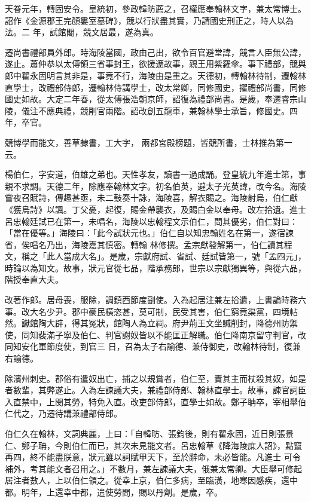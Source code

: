 \begin{pinyinscope}
 天眷元年，轉固安令。皇統初，參政韓昉薦之，召權應奉翰林文字，兼太常博士。詔作《金源郡王完顏婁室墓碑》，競以行狀盡其實，乃請國史刑正之，時人以為法。二
 年，試館閣，競文居最，遂為真。



 遷尚書禮部員外郎。時海陵當國，政由己出，欲令百官避堂諱，競言人臣無公諱，遂止。蕭仲恭以太傅領三省事封王，欲援遼故事，親王用紫羅傘。事下禮部，競與郎中翟永固明言其非是，事竟不行，海陵由是重之。天德初，轉翰林待制，遷翰林直學士，改禮部侍郎，遷翰林侍講學士，改太常卿，同修國史，擢禮部尚書，同修國史如故。大定二年春，從太傅張浩朝京師，詔復為禮部尚書。是歲，奉遷睿宗山陵，儀注不應典禮，競削官兩階。詔改創五龍車，兼翰林學士承旨，修國史。四年，卒官。



 競博學而能文，善草隸書，工大字，
 兩都宮殿榜題，皆競所書，士林推為第一云。



 楊伯仁，字安道，伯雄之弟也。天性孝友，讀書一過成誦。登皇統九年進士第，事親不求調。天德二年，除應奉翰林文字。初名伯英，避太子光英諱，改今名。海陵嘗夜召賦詩，傳趣甚亟，未二鼓奏十詠，海陵喜，解衣賜之。海陵射烏，伯仁獻《獲烏詩》以諷。丁父憂，起復，賜金帶襲衣，及賜白金以奉母。改左拾遺。進士呂忠翰廷試已在第一，未唱名，海陵以忠翰程文示伯仁，問其優劣，伯仁對曰：「當在優等。」海陵曰：「此今試狀元也。」伯仁自以知忠翰姓名在第一，遂宿諫省，俟唱名乃出，海陵嘉其慎密。轉翰
 林修撰。孟宗獻發解第一，伯仁讀其程文，稱之「此人當成大名」。是歲，宗獻府試、省試、廷試皆第一，號「孟四元」，時論以為知文。故事，狀元官從七品，階承務郎，世宗以宗獻獨異等，與從六品，階授奉直大夫。



 改著作郎。居母喪，服除，調鎮西節度副使。入為起居注兼左拾遺，上書論時務六事。改大名少尹。郡中豪民橫恣甚，莫可制，民受其害，伯仁窮竟渠黨，四境帖然。讞館陶大辟，得其冤狀，館陶人為立祠。府尹荊王文坐贓削封，降德州防禦使，同知裴滿子寧及伯仁、判官謝奴皆以不能匡正解職。伯仁降南京留守判官，改同知安化軍節度使，到官三
 日，召為太子右諭德、兼侍御史，改翰林待制，復兼右諭德。



 除濱州刺史。郡俗有遣奴出亡，捕之以規賞者，伯仁至，責其主而杖殺其奴，如是者數輩，其弊遂止。入為左諫議大夫，兼禮部侍郎、翰林直學士。故事，諫官詞臣入直禁中，上閔其勞，特免入直。改吏部侍郎，直學士如故。鄭子聃卒，宰相舉伯仁代之，乃遷待講兼禮部侍郎。



 伯仁久在翰林，文詞典麗，上曰：「自韓昉、張鈞後，則有翟永固，近日則張景仁、鄭子聃，今則伯仁而已，其次未見能文者。呂忠翰草《降海陵庶人詔》，點竄再四，終不能盡朕意，狀元雖以詞賦甲天下，至於辭命，未必皆能。凡進士
 可令補外，考其能文者召用之。」不數月，兼左諫議大夫，俄兼太常卿。大臣舉可修起居注者數人，上以伯仁領之。從幸上京，伯仁多病，至臨潢，地寒因感疾，還中都。明年，上還幸中都，遣使勞問，賜以丹劑。是歲，卒。




\end{pinyinscope}
